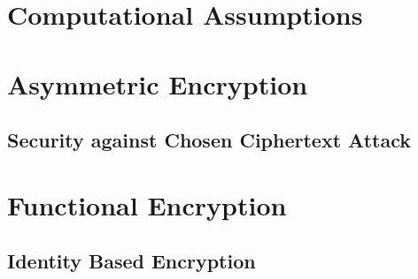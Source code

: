 








\maketitle

\ifTableOfContents 
	\tableofcontents
	\newpage
\fi

\chapter{Computational Assumptions}

\chapter{Asymmetric Encryption}
	\section{Security against Chosen Ciphertext Attack}
	

\chapter{Functional Encryption}
	\section{Identity Based Encryption}
	
	





\appendix



